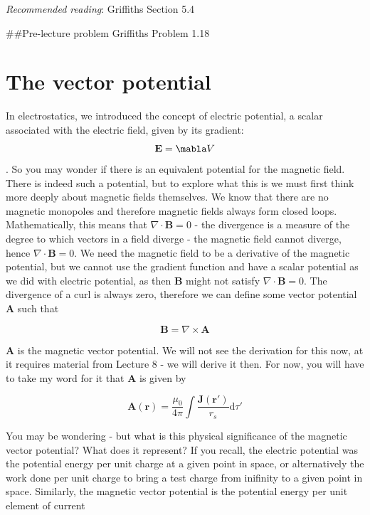 \documentclass[
  letterpaper,
  DIV=11,
  numbers=noendperiod]{scrreprt}
\begin{document}
\newcommand{\a}{\mathrm{\mathbf{a}}}
\newcommand{\b}{\mathrm{\mathbf{b}}}
\newcommand{\I}{\mathrm{\mathbf{I}}}
\newcommand{\K}{\mathrm{\mathbf{K}}}
\newcommand{\J}{\mathrm{\mathbf{J}}}
\newcommand{\A}{\mathrm{\mathbf{A}}}
\newcommand{\dd}{\mathrm{d}}

\emph{Recommended reading}: Griffiths Section 5.4

\#\#Pre-lecture problem Griffiths Problem 1.18

\section{The vector potential}\label{the-vector-potential}

In electrostatics, we introduced the concept of electric potential, a
scalar associated with the electric field, given by its gradient:
\[ \mathrm{\mathbf{E}}= \mabla V\]. So you may wonder if there is an
equivalent potential for the magnetic field. There is indeed such a
potential, but to explore what this is we must first think more deeply
about magnetic fields themselves. We know that there are no magnetic
monopoles and therefore magnetic fields always form closed loops.
Mathematically, this means that \(\nabla \cdot \mathrm{\mathbf{B}}= 0\)
- the divergence is a measure of the degree to which vectors in a field
diverge - the magnetic field cannot diverge, hence
\(\nabla \cdot \mathrm{\mathbf{B}}= 0\). We need the magnetic field to
be a derivative of the magnetic potential, but we cannot use the
gradient function and have a scalar potential as we did with electric
potential, as then \(\mathrm{\mathbf{B}}\) might not satisfy
\(\nabla \cdot \mathrm{\mathbf{B}}= 0\). The divergence of a curl is
always zero, therefore we can define some vector potential
\(\mathrm{\mathbf{A}}\) such that

\[ \mathrm{\mathbf{B}}= \nabla \times \mathrm{\mathbf{A}}\]

\(\mathrm{\mathbf{A}}\) is the magnetic vector potential. We will not
see the derivation for this now, at it requires material from Lecture 8
- we will derive it then. For now, you will have to take my word for it
that \(\mathrm{\mathbf{A}}\) is given by

\[ \mathrm{\mathbf{A}}(\mathrm{\mathbf{r}}) = \frac{\mu_0}{4 \pi} \int \frac{\mathrm{\mathbf{J}}(\mathrm{\mathbf{r}}')}{r_s} \mathrm{d}\tau'\]

You may be wondering - but what is this physical significance of the
magnetic vector potential? What does it represent? If you recall, the
electric potential was the potential energy per unit charge at a given
point in space, or alternatively the work done per unit charge to bring
a test charge from inifinity to a given point in space. Similarly, the
magnetic vector potential is the potential energy per unit element of
current
\end{document}
